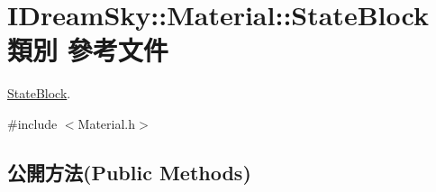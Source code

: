 \hypertarget{class_i_dream_sky_1_1_material_1_1_state_block}{}\section{I\+Dream\+Sky\+:\+:Material\+:\+:State\+Block 類別 參考文件}
\label{class_i_dream_sky_1_1_material_1_1_state_block}


\hyperlink{class_i_dream_sky_1_1_material_1_1_state_block}{State\+Block}.  




{\ttfamily \#include $<$Material.\+h$>$}

\subsection*{公開方法(Public Methods)}
